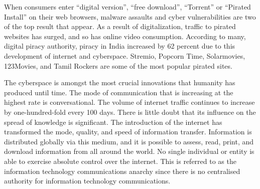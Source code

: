 \setcounter{figure}{0}
\setcounter{table}{0}
\setcounter{footnote}{0}

\label{2019-art3}

\begin{multicols}{2}



\noi
When consumers enter “digital version”, “free download”, “Torrent” or “Pirated Install” on
their web browsers, malware assaults and cyber vulnerabilities are two of the top result that
appear. As a result of digitalization, traffic to pirated websites has surged, and so has online
video consumption. According to many, digital piracy authority, piracy in India increased by
62 percent due to this development of internet and cyberspace. Stremio, Popcorn Time,
Solarmovies, 123Movies, and Tamil Rockers are some of the most popular pirated sites.


\noi
The cyberspace is amongst the most crucial innovations that humanity has produced until
time. The mode of communication that is increasing at the highest rate is conversational. The
volume of internet traffic continues to increase by one-hundred-fold every 100 days. There is
little doubt that its influence on the spread of knowledge is significant. The introduction of
the internet has transformed the mode, quality, and speed of information transfer. Information
is distributed globally via this medium, and it is possible to assess, read, print, and download
information from all around the world. No single individual or entity is able to exercise
absolute control over the internet. This is referred to as the information technology
communications anarchy since there is no centralised authority for information technology
communications.



\end{multicols}
